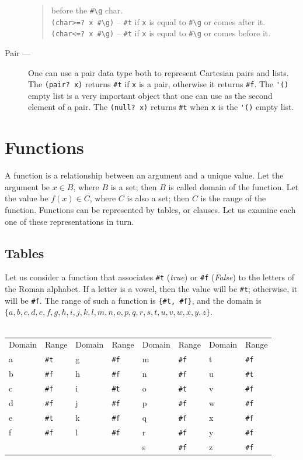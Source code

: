 \documentclass[a4paper,12pt]{book}
\begin{document}
\begin{description}
\begin{quote}
before the \verb|#\g| char.\\
\verb|(char>=? x #\g)| -- \verb|#t| if \verb|x| is
equal to \verb|#\g| or comes after it.\\
\verb|(char<=? x #\g)| -- \verb|#t| if \verb|x| is
equal to \verb|#\g| or comes before it.\\
\end{quote}
\item[Pair ---] One can use a pair data type
both to represent Cartesian pairs and lists.
The \verb|(pair? x)| returns \verb|#t| if
\verb|x| is a pair, otherwise it returns \verb|#f|.
The \verb|'()| empty list is a very important
object that one can use as the second element
of a pair. The \verb|(null? x)| returns \verb|#t|
when \verb|x| is the \verb|'()| empty list.
\end{description}


\section{Functions}
A function is a relationship between an argument and a unique value.
Let the argument be $x\in B$, where $B$ is a set; then $B$ is called
domain of the function. Let the value be $f(x)\in C$, where $C$ is
also a set; then $C$ is the range of the function.
Functions can be represented by tables, or clauses. Let us examine
each one of these representations in turn.

\subsection*{Tables}
Let us consider a function that associates \verb|#t| ({\em true})
or \verb|#f| ({\em False}) to the
letters of the Roman alphabet. If a letter is a vowel,
then the value will be \verb|#t|; otherwise, 
it will be \verb|#f|. The range of such a function
is \verb|{#t, #f}|, and the domain is
$\{a,b,c,d,e,f,g,h,i,j,k,l,m,n,o,p,q,r,s,t,u,v,w,x,y,z\}$.\\

\verb||\\
{\footnotesize
\begin{tabular}{|p{1.2cm} p{1.2cm} | p{1.2cm} p{1.2cm} |p{1.2cm} p{1.2cm} | p{1.2cm} p{1.2cm} |}
Domain & Range & Domain & Range & Domain & Range & Domain & Range\\
a & \verb|#t| & g &\verb|#f| & m &\verb|#f| & t & \verb|#f| \\
b & \verb|#f| & h &\verb|#f| & n & \verb|#f| & u & \verb|#t| \\
c & \verb|#f| &  i &\verb|#t| &o &\verb|#t| & v & \verb|#f|\\
d &\verb|#f| &  j & \verb|#f| & p & \verb|#f| & w & \verb|#f| \\
e &\verb|#t| & k & \verb|#f| & q & \verb|#f| & x & \verb|#f| \\
f &\verb|#f| &  l &\verb|#f| & r & \verb|#f| & y & \verb|#f| \\
&            &                 &  & s & \verb|#f| & z & \verb|#f|\\
\end{tabular}}
\end{document}
